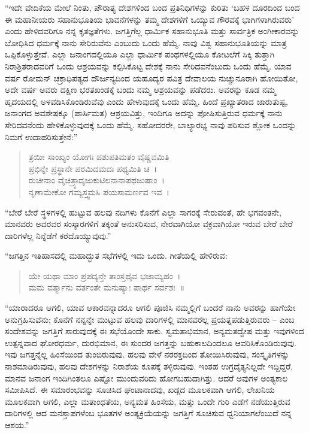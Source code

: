 “ಇದೇ ವೇದಿಕೆಯ ಮೇಲೆ ನಿಂತು, ಪೌರಾತ್ಯ ದೇಶಗಳಿಂದ ಬಂದ ಪ್ರತಿನಿಧಿಗಳನ್ನು ಕುರಿತು ‘ಬಹಳ ದೂರದಿಂದ ಬಂದ ಈ ಮಹಾನೀಯರು ಸಹಾನುಭೂತಿಯ ಭಾವನೆಗಳನ್ನು ತಮ್ಮ ದೇಶಗಳಿಗೆ ಒಯ್ಯುವ ಗೌರವಕ್ಕೆ ಭಾಗಿಗಳಾಗಿರುವರು’ ಎಂದು ಹೇಳಿದವರಿಗೂ ನನ್ನ ಕೃತಜ್ಞತೆಗಳು. ಜಗತ್ತಿಗೆಲ್ಲ ಧಾರ್ಮಿಕ ಸಹಾನುಭೂತಿ ಮತ್ತು ಸಾರ್ವತ್ರಿಕ ಅಂಗೀಕಾರವನ್ನು ಬೋಧಿಸಿದ ಧರ್ಮಕ್ಕೆ ನಾನು ಸೇರಿರುವೆನು ಎಂಬುದು ಒಂದು ಹೆಮ್ಮೆ. ನಾವು ವಿಶ್ವ ಸಹಾನುಭೂತಿಯನ್ನು ಮಾತ್ರ ಒಪ್ಪಿಕೊಳ್ಳುತ್ತೇವೆ. ಎಲ್ಲಾ ಜನಾಂಗದಲ್ಲಿಯೂ ಎಲ್ಲಾ ಧಾರ್ಮಿಕ ಪಂಥಗಳಲ್ಲಿಯೂ ಕೋಟಲೆಗೆ ಸಿಕ್ಕಿ ತುತ್ತಾಗಿ ನಿರಾಶ್ರಿತರಾದವರಿಗೆ ಒಂದು ಆಶ್ರಯವನ್ನು ಕಲ್ಪಿಸಿಕೊಟ್ಟ ದೇಶಕ್ಕೆ ನಾನು ಸೇರಿದವನೆಂಬುದು ಒಂದು ಹೆಮ್ಮೆ. ಯಾವ ವರ್ಷ ರೋಮನ್ ಚಕ್ರಾಧಿಪತ್ಯದ ದೌರ್ಜನ್ಯದಿಂದ ಯಹೂದ್ಯರ ಪವಿತ್ರ ದೇವಾಲಯ ನುಚ್ಚುನೂರಾಗಿ ಹೋಯಿತೋ, ಅದೇ ವರ್ಷ ಅವರು ದಕ್ಷಿಣ ಭರತಖಂಡಕ್ಕೆ ಬಂದು ನಮ್ಮ ಆಶ್ರಯವನ್ನು ಪಡೆದರು. ಅವರನ್ನು ಕೂಡ ನಮ್ಮ ಹೃದಯದಲ್ಲಿ ಅಳವಡಿಸಿಕೊಂಡಿರುವೆವು ಎಂದು ಹೇಳುವುದಕ್ಕೆ ಒಂದು ಹೆಮ್ಮೆ. ಹಿಂದೆ ಪ್ರಖ್ಯಾತರಾದ ಜಾರುತುಷ್ಟ, ಜನಾಂಗದ ಅವಶೇಷಕ್ಕೂ (ಪಾರ್ಸಿಮತ) ಆಶ್ರಯವಿತ್ತು, ಇಂದಿಗೂ ಅದನ್ನು ಪೋಷಿಸುತ್ತಿರುವ ಧರ್ಮಕ್ಕೆ ನಾನು ಸೇರಿದವನೆಂದು ಹೇಳಿಕೊಳ್ಳುವುದಕ್ಕೆ ಒಂದು ಹೆಮ್ಮೆ. ಸಹೋದರರೇ, ಬಾಲ್ಯಾರಭ್ಯ ನಾವು ಪಠಿಸುವ ಶ್ಲೋಕ ಒಂದನ್ನು ನಿಮಗೆ ಉದಾಹರಿಸುತ್ತೇನೆ:”

\begin{verse}
ತ್ರಯೀ ಸಾಂಖ್ಯಂ ಯೋಗಃ ಪಶುಪತಿಮತಂ ವೈಷ್ಣವಮಿತಿ\\ಪ್ರಭಿನ್ನೇ ಪ್ರಸ್ಥಾನೇ ಪರಮಿದಮದಃ ಪಥ್ಯಮಿತಿ ಚ~।\\ರುಚೀನಾಂ ವೈಚಿತ್ರ್ಯಾದೃಜುಕುಟಿಲನಾನಾಪಥಜುಷಾಂ~।\\ನೃಣಾಮೇಕೋ ಗಮ್ಯಸ್ತ್ವಮಸಿ ಪಯಸಾಮರ್ಣವ ಇವ~।
\end{verse}

“ಬೇರೆ ಬೇರೆ ಸ್ಥಳಗಳಲ್ಲಿ ಹುಟ್ಟುವ ಹಲವು ನದಿಗಳು ಕೊನೆಗೆ ಎಲ್ಲಾ ಸಾಗರಕ್ಕೆ ಸೇರುವಂತೆ, ಹೇ ಭಗವಂತನೇ, ಮಾನವರು ಅವರವರ ಸಂಸ್ಕಾರಗಳಿಗೆ ತಕ್ಕಂತೆ ಅನುಸರಿಸುವ, ನೇರವಾಗಿಯೋ ವಕ್ರವಾಗಿಯೋ ಇರುವ ಬೇರೆ ಬೇರೆ ದಾರಿಗಳೆಲ್ಲ ನಿನ್ನೆಡೆಗೆ ಕರೆದೊಯ್ಯುವುವು.” 

 “ಜಗತ್ತಿನ ಇತಿಹಾಸದಲ್ಲಿ ಮಹಾದ್ಭುತ ಸಭೆಗಳಲ್ಲಿ ಇದು ಒಂದು. ಗೀತೆಯಲ್ಲಿ ಹೇಳಿರುವ:

\begin{verse}
ಯೇ ಯಥಾ ಮಾಂ ಪ್ರಪದ್ಯನ್ತೇ ತಾಂಸ್ತಥೈವ ಭಜಾಮ್ಯಹಂ~।\\ಮಮ ವರ್ತ್ಮಾನು ವರ್ತಂತೇ ಮನುಷ್ಯಾಃ ಪಾರ್ಥ ಸರ್ವಶಃ~॥
\end{verse}

“ಯಾರಾದರೂ ಆಗಲಿ, ಯಾವ ಆಕಾರವನ್ನಾದರೂ ಆಗಲಿ ಪೂಜಿಸಿ ನಮ್ಮಲ್ಲಿಗೆ ಬಂದರೆ ನಾನು ಅವರನ್ನು ಹಾಗೆಯೇ ಅನುಗ್ರಹಿಸುವೆನು; ಕೊನೆಗೆ ನನ್ನನ್ನೇ ಮುಟ್ಟುವ ಹಲವು ದಾರಿಗಳಲ್ಲಿ ಮಾನವರೆಲ್ಲ ಪ್ರಯತ್ನಪಡುತ್ತಿರುವರು – ಎಂಬ ಸಂದೇಶವನ್ನು ಜಗತ್ತಿಗೆ ಸಾರುವುದಕ್ಕೆ ಈ ಸಭೆಯೊಂದೇ ಸಾಕು. ಸ್ವಮತಾಭಿಮಾನ, ಅನ್ಯಮತದ್ವೇಷ ಮತ್ತು ಇವುಗಳಿಂದ ಉತ್ಪನ್ನವಾದ ಘೋರಧರ್ಮ, ದುರಭಿಮಾನ, ಈ ಸುಂದರ ಜಗತ್ತನ್ನು ಬಹುಕಾಲದಿಂದಲೂ ಆವರಿಸಿಕೊಂಡಿರುವುವು. ಇವು ಜಗತ್ತನ್ನೆಲ್ಲ ಹಿಂಸೆಯಿಂದ ತುಂಬಿರುವುವು. ಹಲವು ವೇಳೆ ನರರಕ್ತದಿಂದ ತೋಯಿಸಿರುವುವು, ಸಂಸ್ಕೃತಿಗಳನ್ನು ನಾಶಮಾಡಿರುವುವು, ಹಲವು ದೇಶಗಳನ್ನು ನಿರಾಶೆಯ ಕೂಪಕ್ಕೆ ತಳ್ಳಿರುವುವು. ಇಂತಹ ಉಗ್ರದೈತ್ಯನಿಲ್ಲದೇ ಇದ್ದಿದ್ದರೆ, ಮಾನವ ಜನಾಂಗ ಇಂದಿಗಿಂತಲೂ ಎಷ್ಟೋ ಮುಂದುವರಿದು ಹೋಗಬಹುದಾಗಿತ್ತು. ಆದರೆ ಅವುಗಳ ಅಂತ್ಯಕಾಲ ಸಮೀಪಿಸಿದೆ. ಈ ಸಮಾರಂಭವನ್ನು ಸೂಚಿಸಿದ ಘಂಟಾನಾದವು, ಖಡ್ಗದ ಮೂಲಕವಾಗಿ ಆಗಲಿ, ಲೇಖನಿಯ ಮೂಲಕವಾಗಿ ಆಗಲಿ, ಎಲ್ಲಾ ಮತಾಂಧತೆಯ, ಅನ್ಯಮತ ಹಿಂಸೆಯ, ಮತ್ತು ಒಂದೇ ಗುರಿ ಎಡೆಗೆ ನಡೆಯುತ್ತಿರುವ ದಾರಿಗಳಲ್ಲಿ ಆದ ಮನಸ್ತಾಪಗಳೆಂಬ ಭೂತಗಳ ಅಂತ್ಯಕ್ರಿಯೆಯನ್ನು ಜಗತ್ತಿಗೆ ಸೂಚಿಸುವ ಧ್ವನಿಯಾಗಲೆಂಬುದೆ ನನ್ನ ಆಶಯ.” 

